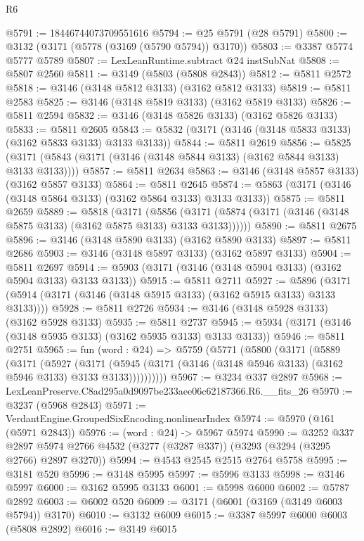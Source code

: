 \begin{lexlean}{R6}
\begin{coremodule}
@5791 := 18446744073709551616
@5794 := @25 @5791 (@28 @5791)
@5800 := @3132 (@3171 (@5778 (@3169 (@5790 @5794)) @3170))
@5803 := @3387 @5774 @5777 @5789
@5807 := LexLeanRuntime.subtract @24 instSubNat
@5808 := @5807 @2560
@5811 := @3149 (@5803 (@5808 @2843))
@5812 := @5811 @2572
@5818 := @3146 (@3148 @5812 @3133) (@3162 @5812 @3133)
@5819 := @5811 @2583
@5825 := @3146 (@3148 @5819 @3133) (@3162 @5819 @3133)
@5826 := @5811 @2594
@5832 := @3146 (@3148 @5826 @3133) (@3162 @5826 @3133)
@5833 := @5811 @2605
@5843 := @5832 (@3171 (@3146 (@3148 @5833 @3133) (@3162 @5833 @3133) @3133 @3133))
@5844 := @5811 @2619
@5856 := @5825 (@3171 (@5843 (@3171 (@3146 (@3148 @5844 @3133) (@3162 @5844 @3133) @3133 @3133))))
@5857 := @5811 @2634
@5863 := @3146 (@3148 @5857 @3133) (@3162 @5857 @3133)
@5864 := @5811 @2645
@5874 := @5863 (@3171 (@3146 (@3148 @5864 @3133) (@3162 @5864 @3133) @3133 @3133))
@5875 := @5811 @2659
@5889 := @5818
    (@3171
      (@5856 (@3171 (@5874 (@3171 (@3146 (@3148 @5875 @3133) (@3162 @5875 @3133) @3133 @3133))))))
@5890 := @5811 @2675
@5896 := @3146 (@3148 @5890 @3133) (@3162 @5890 @3133)
@5897 := @5811 @2686
@5903 := @3146 (@3148 @5897 @3133) (@3162 @5897 @3133)
@5904 := @5811 @2697
@5914 := @5903 (@3171 (@3146 (@3148 @5904 @3133) (@3162 @5904 @3133) @3133 @3133))
@5915 := @5811 @2711
@5927 := @5896 (@3171 (@5914 (@3171 (@3146 (@3148 @5915 @3133) (@3162 @5915 @3133) @3133 @3133))))
@5928 := @5811 @2726
@5934 := @3146 (@3148 @5928 @3133) (@3162 @5928 @3133)
@5935 := @5811 @2737
@5945 := @5934 (@3171 (@3146 (@3148 @5935 @3133) (@3162 @5935 @3133) @3133 @3133))
@5946 := @5811 @2751
@5965 := fun (word : @24) =>
  @5759
    (@5771
      (@5800
        (@3171
          (@5889
            (@3171
              (@5927
                (@3171
                  (@5945 (@3171 (@3146 (@3148 @5946 @3133) (@3162 @5946 @3133) @3133 @3133))))))))))
@5967 := @3234 @337 @2897
@5968 := LexLeanPreserve.C8ad295a0d9097be233aee06c62187366.R6.__fits_26
@5970 := @3237 (@5968 @2843)
@5971 := VerdantEngine.GroupedSixEncoding.nonlinearIndex
@5974 := @5970 (@161 (@5971 @2843))
@5976 := (word : @24) -> @5967 @5974
@5990 := @3252
    @337
    @2897
    @5974
    @2766
    @4532
    (@3277 (@3287 @337))
    (@3293 (@3294 (@3295 @2766) @2897 @3270))
@5994 := @4543 @2545 @2515 @2764 @5758
@5995 := @3181 @520
@5996 := @3148 @5995
@5997 := @5996 @3133
@5998 := @3146 @5997
@6000 := @3162 @5995 @3133
@6001 := @5998 @6000
@6002 := @5787 @2892
@6003 := @6002 @520
@6009 := @3171 (@6001 (@3169 (@3149 @6003 @5794)) @3170)
@6010 := @3132 @6009
@6015 := @3387 @5997 @6000 @6003 (@5808 @2892)
@6016 := @3149 @6015

\end{coremodule}
\end{lexlean}

